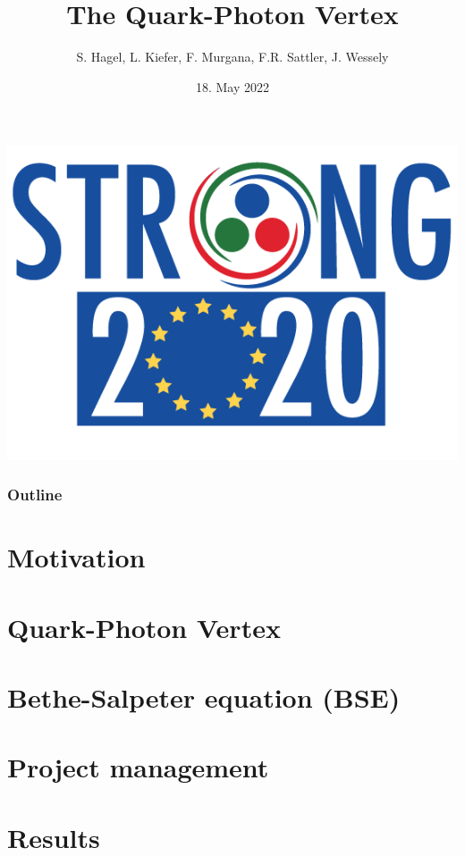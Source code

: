 \documentclass[pt12]{beamer}
\title[ECT* DTP 2022]{The Quark-Photon Vertex}
\author{S. Hagel, L. Kiefer, F. Murgana, F.R. Sattler, J. Wessely}
\date{18. May 2022}
\begin{document}
  \begin{frame}[plain]
    \titlepage
    \begin{center}
      \includegraphics[width=0.45\linewidth]{graphics/Logo_STRONG_vert- trasparente}
    \end{center}
  \end{frame}

  \begin{frame}[label=outline]\frametitle{Outline}
    \tableofcontents
  \end{frame}

  \section{Motivation}\label{sec:1}
  


  \section{Quark-Photon Vertex}\label{sec:2}
    

  \section{Bethe-Salpeter equation (BSE)}\label{sec:3}
    
    
    
    

  \section{Project management}\label{sec:4}
    

  \section{Results}\label{sec:5}
    
\end{document}
